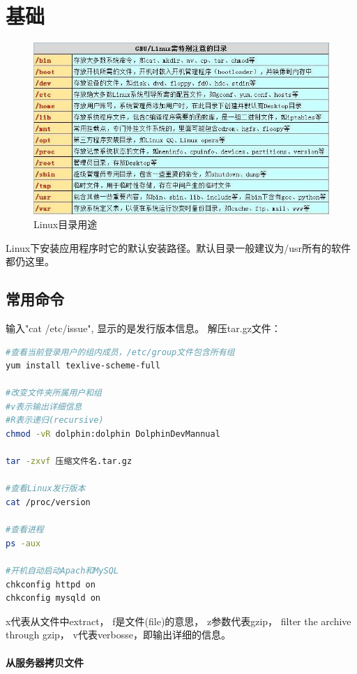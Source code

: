 \documentclass{book}
\begin{document}
\section{基础}

\begin{figure}[htbp]
	\centering
	\includegraphics[scale=0.6]{LinuxDirectoryExplain.jpg}
	\caption{Linux目录用途}
	\label{code:LinuxDirectoryExplain}
\end{figure}


Linux下安装应用程序时它的默认安装路径。默认目录一般建议为/usr所有的软件都仍这里。

\subsection{常用命令}

输入"cat /etc/issue", 显示的是发行版本信息。
解压tar.gz文件：

\begin{lstlisting}[language=Bash]
#查看当前登录用户的组内成员，/etc/group文件包含所有组
yum install texlive-scheme-full

#改变文件夹所属用户和组
#v表示输出详细信息
#R表示递归(recursive)
chmod -vR dolphin:dolphin DolphinDevMannual

tar -zxvf 压缩文件名.tar.gz

#查看Linux发行版本
cat /proc/version

#查看进程
ps -aux

#开机自动启动Apach和MySQL
chkconfig httpd on
chkconfig mysqld on
\end{lstlisting}

x代表从文件中extract，
f是文件(file)的意思，
z参数代表gzip，
filter the archive through gzip，
v代表verbosse，即输出详细的信息。

\paragraph{从服务器拷贝文件}
\end{document}
